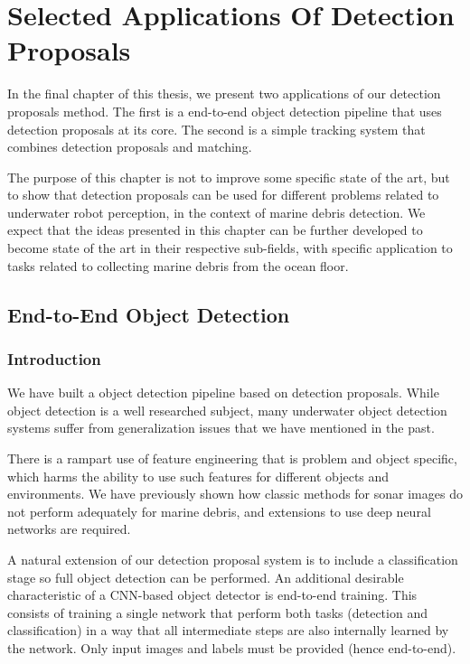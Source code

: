 \chapter[Selected Applications Of Detection Proposals]{Selected Applications Of \newline Detection Proposals}
\label{chapter:applications}

In the final chapter of this thesis, we present two applications of our detection proposals method. The first is a end-to-end object detection pipeline that uses detection proposals at its core. The second is a simple tracking system that combines detection proposals and matching.

The purpose of this chapter is not to improve some specific state of the art, but to show that detection proposals can be used for different problems related to underwater robot perception, in the context of marine debris detection. We expect that the ideas presented in this chapter can be further developed to become state of the art in their respective sub-fields, with specific application to tasks related to collecting marine debris from the ocean floor.

\section{End-to-End Object Detection}

\subsection{Introduction}

We have built a object detection pipeline based on detection proposals. While object detection is a well researched subject, many underwater object detection systems suffer from generalization issues that we have mentioned in the past.

There is a rampart use of feature engineering that is problem and object specific, which harms the ability to use such features for different objects and environments. We have previously shown how classic methods for sonar images do not perform adequately for marine debris, and extensions to use deep neural networks are required.

A natural extension of our detection proposal system is to include a classification stage so full object detection can be performed. An additional desirable characteristic of a CNN-based object detector is end-to-end training. This consists of training a single network that perform both tasks (detection and classification) in a way that all intermediate steps are also internally learned by the network. Only input images and labels must be provided (hence end-to-end).

